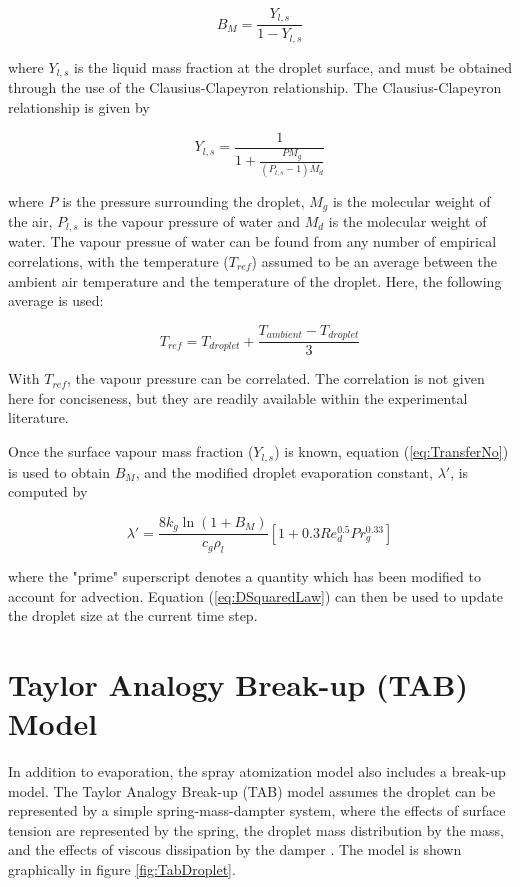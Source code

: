 \documentclass[12pt]{article}
\begin{document}
\begin{equation}\label{eq:TransferNo}
B_{M} = \frac{Y_{l, s}}{1 - Y_{l, s}}
\end{equation}

where $Y_{l, s}$ is the liquid mass fraction at the droplet surface, and must be obtained through the use of the Clausius-Clapeyron relationship. The Clausius-Clapeyron relationship is given by

\begin{equation}
Y_{l, s} = \frac{1}{1 + \frac{PM_{g}}{(P_{l, s} - 1)M_{d}}}
\end{equation}

where $P$ is the pressure surrounding the droplet, $M_{g}$ is the molecular weight of the air, $P_{l, s}$ is the vapour pressure of water and $M_{d}$ is the molecular weight of water. The vapour pressue of water can be found from any number of empirical correlations, with the temperature ($T_{ref}$) assumed to be an average between the ambient air temperature and the temperature of the droplet. Here, the following average is used:

\begin{equation}
T_{ref} = T_{droplet} + \frac{T_{ambient} - T_{droplet}}{3}
\end{equation}

With $T_{ref}$, the vapour pressure can be correlated. The correlation is not given here for conciseness, but they are readily available within the experimental literature.

Once the surface vapour mass fraction ($Y_{l, s}$) is known, equation (\ref{eq:TransferNo}) is used to obtain $B_{M}$, and the modified droplet evaporation constant, $\lambda'$, is computed by

\begin{equation}
\lambda' = \frac{8k_{g}\ln(1 + B_{M})}{c_{g}\rho_{l}}\left[1 + 0.3Re_{d}^{0.5}Pr_{g}^{0.33}\right]
\end{equation}

where the "prime" superscript denotes a quantity which has been modified to account for advection. Equation (\ref{eq:DSquaredLaw}) can then be used to update the droplet size at the current time step.

\section{Taylor Analogy Break-up (TAB) Model}\label{sec:TABModel}

In addition to evaporation, the spray atomization model also includes a break-up model. The Taylor Analogy Break-up (TAB) model assumes the droplet can be represented by a simple spring-mass-dampter system, where the effects of surface tension are represented by the spring, the droplet mass distribution by the mass, and the effects of viscous dissipation by the damper \cite{Kabaliuk2014}. The model is shown graphically in figure \ref{fig:TabDroplet}.
\end{document}
